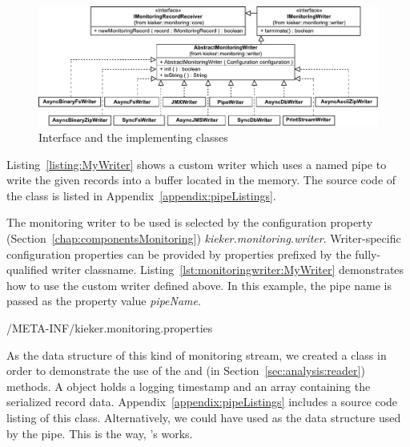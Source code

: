 \begin{figure}[H]
\begin{centering}
\includegraphics[scale=0.7]{images/kieker_writerimplsuserguide-modified}
\caption{Interface  and  the implementing classes}
\label{figure:monitoringLogWritersHierarchy}
\end{centering}
\end{figure}

\noindent Listing~\ref{listing:MyWriter} %
shows %
a custom writer  which uses a named pipe to %
write the given records into a buffer located in the memory. The source code of %
the class  is listed in Appendix~\ref{appendix:pipeListings}. %


\pagebreak

\setJavaCodeListing


\pagebreak

\noindent The monitoring writer to be used is selected by the %
\KiekerMonitoringPart{} configuration property (Section~\ref{chap:componentsMonitoring}) %
\textit{kieker.monitoring.writer}. Writer-specific configuration properties %
can be provided by properties prefixed by the fully-qualified writer classname.  %
Listing~\ref{lst:monitoringwriter:MyWriter} demonstrates how to use the custom %
writer  defined above. In this example, the pipe name is %
passed as the property value \textit{pipeName}.

\setPropertiesListing
%
{\customComponentsBookstoreApplicationDir/META-INF/kieker.monitoring.properties}

\enlargethispage{1cm}

\noindent As the data structure of this kind of monitoring stream, we created a %
class  in order to demonstrate the use of the  and %
 (in Section~\ref{sec:analysis:reader}) methods. %
A  object holds a logging timestamp and an  array %
containing the serialized record data. %
Appendix~\ref{appendix:pipeListings} includes a source code listing of this class. %
Alternatively, we could have used  as the data structure %
used by the pipe. This is the way, \Kieker{}'s  works. %

